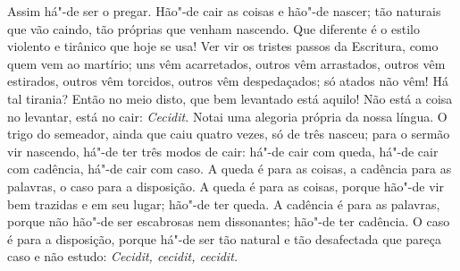 Assim há"-de ser o pregar. Hão"-de cair as coisas e hão"-de nascer; tão
naturais que vão caindo, tão próprias que venham nascendo. Que
diferente é o estilo violento e tirânico que hoje se usa! Ver vir os
tristes passos da Escritura, como quem vem ao martírio; uns vêm
acarretados, outros vêm arrastados, outros vêm estirados, outros vêm
torcidos, outros vêm despedaçados; só atados não vêm! Há tal tirania?
Então no meio disto, que bem levantado está aquilo! Não está a coisa no
levantar, está no cair: \emph{Cecidit.} Notai uma alegoria própria da
nossa língua. O trigo do semeador, ainda
que caiu quatro vezes, só de três nasceu; para o sermão vir nascendo,
há"-de ter três modos de cair: há"-de cair com queda, há"-de cair com
cadência, há"-de cair com caso. A queda é para as coisas, a cadência para
as palavras, o caso para a disposição. A queda é para as coisas, porque
hão"-de vir bem trazidas e em seu lugar; hão"-de ter queda. A cadência é
para as palavras, porque não hão"-de ser escabrosas nem dissonantes;
hão"-de ter cadência. O caso é para a disposição, porque há"-de ser tão
natural e tão desafectada que pareça caso e não estudo: \emph{Cecidit,
cecidit, cecidit.}

